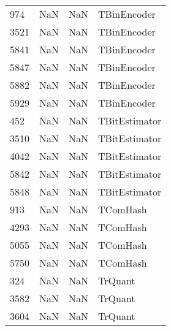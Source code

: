 \begin{tabular}{llll}
974  &                   NaN &                        NaN &                               TBinEncoder \\
3521 &                   NaN &                        NaN &                               TBinEncoder \\
5841 &                   NaN &                        NaN &                               TBinEncoder \\
5847 &                   NaN &                        NaN &                               TBinEncoder \\
5882 &                   NaN &                        NaN &                               TBinEncoder \\
5929 &                   NaN &                        NaN &                               TBinEncoder \\
452  &                   NaN &                        NaN &                             TBitEstimator \\
3510 &                   NaN &                        NaN &                             TBitEstimator \\
4042 &                   NaN &                        NaN &                             TBitEstimator \\
5842 &                   NaN &                        NaN &                             TBitEstimator \\
5848 &                   NaN &                        NaN &                             TBitEstimator \\
913  &                   NaN &                        NaN &                                  TComHash \\
4293 &                   NaN &                        NaN &                                  TComHash \\
5055 &                   NaN &                        NaN &                                  TComHash \\
5750 &                   NaN &                        NaN &                                  TComHash \\
324  &                   NaN &                        NaN &                                   TrQuant \\
3582 &                   NaN &                        NaN &                                   TrQuant \\
3604 &                   NaN &                        NaN &                                   TrQuant \\

\end{tabular}
